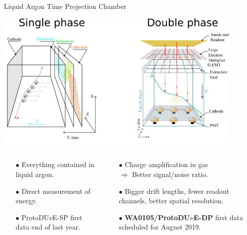 \documentclass[10pt]{beamer}
\begin{document}
    \begin{frame}{Liquid Argon Time Projection Chamber}
    	\begin{scriptsize}
    			\includegraphics[width=0.9\textwidth]{figures/contexte/tpcs.png}\\\vfill
    			\begin{columns}
    				\begin{column}{0.5\textwidth}
    					\begin{itemize}
    						\item[$\bullet$] Everything contained in liquid argon.
    						\item[$\bullet$] Direct measurement of energy.
    						\item[$\bullet$] ProtoDU$\nu$E-SP first data end of last year.
    					\end{itemize}
    				\end{column}\hfill
    				\begin{column}{0.5\textwidth}
    					\begin{itemize}
    						\item[$\bullet$] Charge amplification in gas\\$\Rightarrow$ Better signal/noise ratio.
    						\item[$\bullet$] Bigger drift lengths, fewer readout channels, better spatial resolution.
    						\item[$\bullet$] \textbf{WA0105/ProtoDU$\nu$E-DP} first data scheduled for August 2019.
    					\end{itemize}
    				\end{column}
    			\end{columns}
    	\end{scriptsize}
    \end{frame}
    
\end{document}
